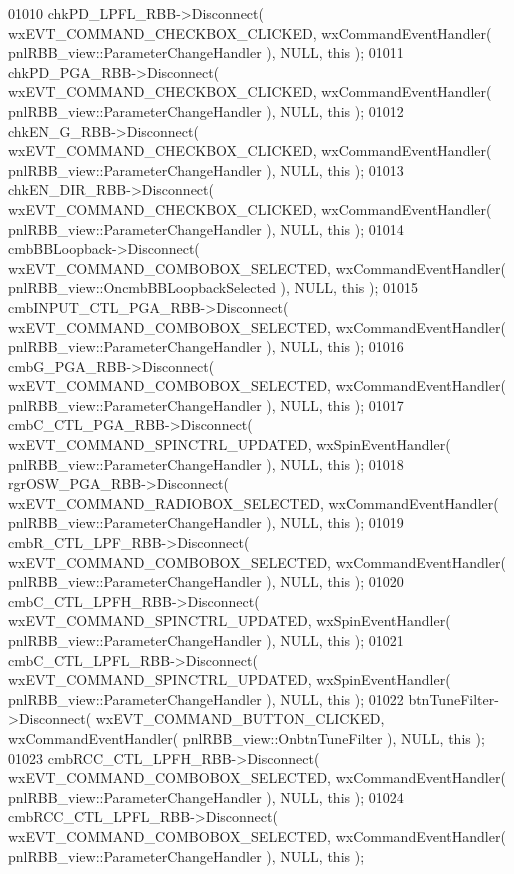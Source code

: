 \begin{DoxyCode}
01010     chkPD_LPFL_RBB->Disconnect( wxEVT\_COMMAND\_CHECKBOX\_CLICKED, wxCommandEventHandler( 
      pnlRBB_view::ParameterChangeHandler ), NULL, \textcolor{keyword}{this} );
01011     chkPD_PGA_RBB->Disconnect( wxEVT\_COMMAND\_CHECKBOX\_CLICKED, wxCommandEventHandler( 
      pnlRBB_view::ParameterChangeHandler ), NULL, \textcolor{keyword}{this} );
01012     chkEN_G_RBB->Disconnect( wxEVT\_COMMAND\_CHECKBOX\_CLICKED, wxCommandEventHandler( 
      pnlRBB_view::ParameterChangeHandler ), NULL, \textcolor{keyword}{this} );
01013     chkEN_DIR_RBB->Disconnect( wxEVT\_COMMAND\_CHECKBOX\_CLICKED, wxCommandEventHandler( 
      pnlRBB_view::ParameterChangeHandler ), NULL, \textcolor{keyword}{this} );
01014     cmbBBLoopback->Disconnect( wxEVT\_COMMAND\_COMBOBOX\_SELECTED, wxCommandEventHandler( 
      pnlRBB_view::OncmbBBLoopbackSelected ), NULL, \textcolor{keyword}{this} );
01015     cmbINPUT_CTL_PGA_RBB->Disconnect( wxEVT\_COMMAND\_COMBOBOX\_SELECTED, wxCommandEventHandler( 
      pnlRBB_view::ParameterChangeHandler ), NULL, \textcolor{keyword}{this} );
01016     cmbG_PGA_RBB->Disconnect( wxEVT\_COMMAND\_COMBOBOX\_SELECTED, wxCommandEventHandler( 
      pnlRBB_view::ParameterChangeHandler ), NULL, \textcolor{keyword}{this} );
01017     cmbC_CTL_PGA_RBB->Disconnect( wxEVT\_COMMAND\_SPINCTRL\_UPDATED, wxSpinEventHandler( 
      pnlRBB_view::ParameterChangeHandler ), NULL, \textcolor{keyword}{this} );
01018     rgrOSW_PGA_RBB->Disconnect( wxEVT\_COMMAND\_RADIOBOX\_SELECTED, wxCommandEventHandler( 
      pnlRBB_view::ParameterChangeHandler ), NULL, \textcolor{keyword}{this} );
01019     cmbR_CTL_LPF_RBB->Disconnect( wxEVT\_COMMAND\_COMBOBOX\_SELECTED, wxCommandEventHandler( 
      pnlRBB_view::ParameterChangeHandler ), NULL, \textcolor{keyword}{this} );
01020     cmbC_CTL_LPFH_RBB->Disconnect( wxEVT\_COMMAND\_SPINCTRL\_UPDATED, wxSpinEventHandler( 
      pnlRBB_view::ParameterChangeHandler ), NULL, \textcolor{keyword}{this} );
01021     cmbC_CTL_LPFL_RBB->Disconnect( wxEVT\_COMMAND\_SPINCTRL\_UPDATED, wxSpinEventHandler( 
      pnlRBB_view::ParameterChangeHandler ), NULL, \textcolor{keyword}{this} );
01022     btnTuneFilter->Disconnect( wxEVT\_COMMAND\_BUTTON\_CLICKED, wxCommandEventHandler( 
      pnlRBB_view::OnbtnTuneFilter ), NULL, \textcolor{keyword}{this} );
01023     cmbRCC_CTL_LPFH_RBB->Disconnect( wxEVT\_COMMAND\_COMBOBOX\_SELECTED, wxCommandEventHandler( 
      pnlRBB_view::ParameterChangeHandler ), NULL, \textcolor{keyword}{this} );
01024     cmbRCC_CTL_LPFL_RBB->Disconnect( wxEVT\_COMMAND\_COMBOBOX\_SELECTED, wxCommandEventHandler( 
      pnlRBB_view::ParameterChangeHandler ), NULL, \textcolor{keyword}{this} );

\end{DoxyCode}
